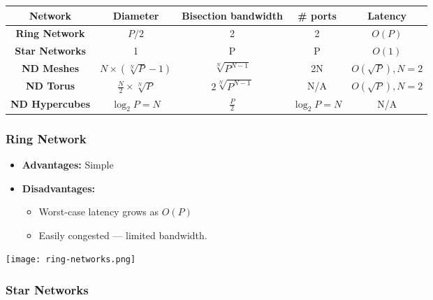 \documentclass[../main.tex]{subfiles}
\begin{document}
\begin{center}
	\begin{tabular}{| c | c | c | c | c |}
		\hline
		\textbf{Network}       & \textbf{Diameter}                  & \textbf{Bisection bandwidth} & \textbf{\# ports} & \textbf{Latency}    \\
		\hline
		\hline
		\textbf{Ring Network}  & \(P/2\)                            & 2                            & 2                 & \(O(P)\)            \\
		\hline
		\textbf{Star Networks} & 1                                  & P                            & P                 & \(O(1)\)            \\
		\hline
		\textbf{ND Meshes}     & \(N \times (\sqrt[N]{P} - 1)\)     & \(\sqrt[N]{P^{N-1}}\)        & 2N                & \(O(\sqrt{P}),N=2\) \\
		\hline
		\textbf{ND Torus}      & \(\frac{N}{2} \times \sqrt[N]{P}\) & \(2\sqrt[N]{P^{N-1}}\)       & N/A               & \(O(\sqrt{P}),N=2\) \\
		\hline
		\textbf{ND Hypercubes} & \(\log_2{P} = N\)                  & \(\frac{P}{2}\)              & \(\log_2{P} = N\) & N/A                 \\
		\hline
	\end{tabular}
\end{center}

\subsubsection{Ring Network}

\begin{multicols}{2}
	\begin{itemize}
		\item \textbf{Advantages:} Simple
		\item \textbf{Disadvantages:}
		      \begin{itemize}
			      \item Worst-case latency grows as \(O(P)\)
			      \item Easily congested --- limited bandwidth.
		      \end{itemize}
	\end{itemize}

	\begin{center}
		\texttt{[image: ring-networks.png]}
	\end{center}
\end{multicols}

\subsubsection{Star Networks}
\end{document}
